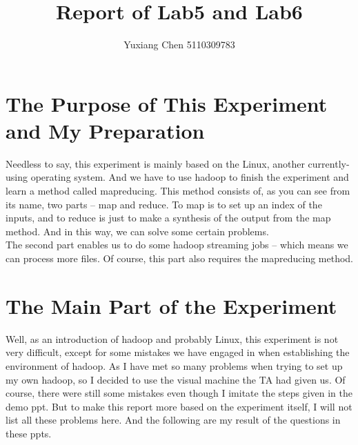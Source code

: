 \documentclass{article}
\author{Yuxiang Chen 5110309783}
\title{Report of Lab5 and Lab6}
\begin{document}
\maketitle
\tableofcontents
\section{The Purpose of This Experiment and My Preparation}
Needless to say, this experiment is mainly based on the Linux, another currently-using operating system. And we have to use hadoop to finish the experiment and learn a method called mapreducing.  This method consists of, as you can see from its name, two parts -- map and reduce. To map is to set up an index of the inputs, and to reduce is just to make a synthesis of the output from the map method. And in this way, we can solve some certain problems.\\
The second part enables us to do some hadoop streaming jobs -- which means we can process more files. Of course, this part also requires the mapreducing method.
\section{The Main Part of the Experiment}
Well, as an introduction of hadoop and probably Linux, this experiment is not very difficult, except for some mistakes we have engaged in when establishing the environment of hadoop. As I have met so many problems when trying to set up my own hadoop, so I decided to use the visual machine the TA had given us.
Of course, there were still some mistakes even though I imitate the steps given in the demo ppt. But to make this report more based on the experiment itself, I will not list all these problems here. And the following are my result of the questions in these ppts.
\end{document}
